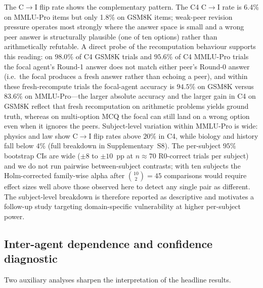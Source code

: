 \documentclass[review,3p,authoryear]{elsarticle}
\begin{document}
The C$\rightarrow$I flip rate shows the complementary pattern.
The C4 C$\rightarrow$I rate is 6.4\% on MMLU-Pro items but only 1.8\%
on GSM8K items; weak-peer revision pressure operates most strongly
where the answer space is small and a wrong peer answer is structurally
plausible (one of ten options) rather than arithmetically refutable.
A direct probe of the recomputation behaviour supports this reading:
on $98.0\%$ of C4 GSM8K trials and $95.6\%$ of C4 MMLU-Pro trials the
focal agent's Round-1 answer does not match either peer's Round-0
answer (i.e.\ the focal produces a fresh answer rather than echoing a
peer), and within these fresh-recompute trials the focal-agent
accuracy is $94.5\%$ on GSM8K versus $83.6\%$ on MMLU-Pro---the
larger absolute accuracy and the larger gain in C4 on GSM8K reflect
that fresh recomputation on arithmetic problems yields ground truth,
whereas on multi-option MCQ the focal can still land on a wrong
option even when it ignores the peers.
Subject-level variation within MMLU-Pro is wide: physics and law show
C$\rightarrow$I flip rates above $20\%$ in C4, while biology and
history fall below $4\%$ (full breakdown in Supplementary~S8).
The per-subject $95\%$ bootstrap CIs are wide ($\pm 8$ to $\pm 10$~pp
at $n \approx 70$ R0-correct trials per subject) and we do not run
pairwise between-subject contrasts; with ten subjects the
Holm-corrected family-wise alpha after $\binom{10}{2} = 45$
comparisons would require effect sizes well above those observed
here to detect any single pair as different.
The subject-level breakdown is therefore reported as descriptive and
motivates a follow-up study targeting domain-specific vulnerability
at higher per-subject power.

\subsection{Inter-agent dependence and confidence diagnostic}
\label{sub:dependence}

Two auxiliary analyses sharpen the interpretation of the headline results.
\end{document}
